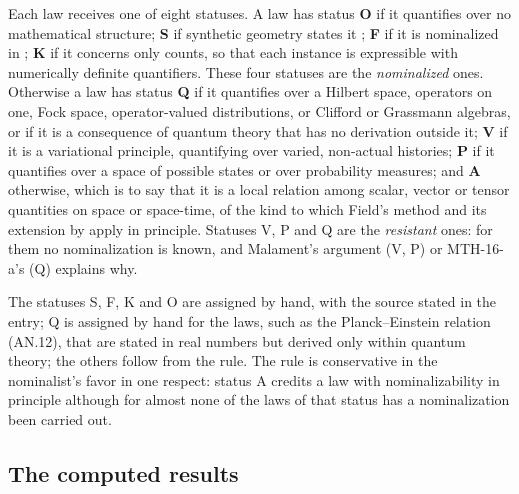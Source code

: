 \documentclass{situationist-preprint}
\begin{document}
\begin{definition}\label{d:status}
Each law receives one of eight statuses. A law has status \textbf{O} if it quantifies over no mathematical structure; \textbf{S} if synthetic geometry states it \citep{Hilbert1899,Field1980,Robb1914}; \textbf{F} if it is nominalized in \citet{Field1980}; \textbf{K} if it concerns only counts, so that each instance is expressible with numerically definite quantifiers. These four statuses are the \emph{nominalized} ones. Otherwise a law has status \textbf{Q} if it quantifies over a Hilbert space, operators on one, Fock space, operator-valued distributions, or Clifford or Grassmann algebras, or if it is a consequence of quantum theory that has no derivation outside it; \textbf{V} if it is a variational principle, quantifying over varied, non-actual histories; \textbf{P} if it quantifies over a space of possible states or over probability measures; and \textbf{A} otherwise, which is to say that it is a local relation among scalar, vector or tensor quantities on space or space-time, of the kind to which Field's method and its extension by \citet{ArntzeniusDorr2012} apply in principle. Statuses V, P and Q are the \emph{resistant} ones: for them no nominalization is known, and Malament's argument (V, P) or MTH-16-a's (Q) explains why.
\end{definition}

The statuses S, F, K and O are assigned by hand, with the source stated in the entry; Q is assigned by hand for the laws, such as the Planck--Einstein relation (AN.12), that are stated in real numbers but derived only within quantum theory; the others follow from the rule. The rule is conservative in the nominalist's favor in one respect: status A credits a law with nominalizability in principle although for almost none of the \nStatA{} laws of that status has a nominalization been carried out.

\subsection{The computed results}
\end{document}
